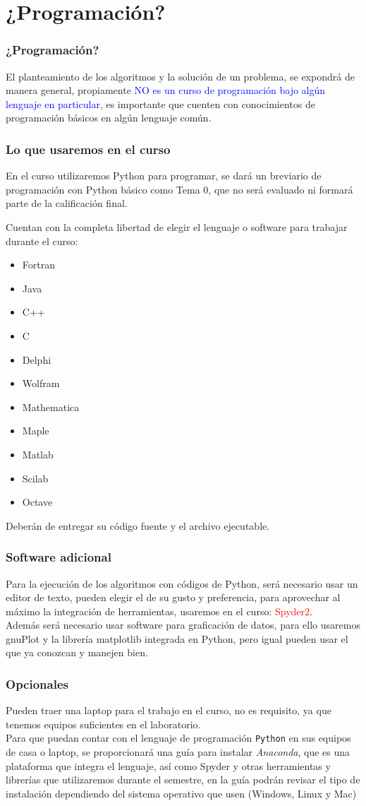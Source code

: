 \documentclass[12pt]{beamer}
\begin{document}
\section{¿Programación?}
\begin{frame}
\frametitle{¿Programación?}
El planteamiento de los algoritmos y la solución de un problema, se expondrá de manera general, propiamente \textcolor{blue}{NO es un curso de programación bajo algún lenguaje en particular}, es importante que cuenten con conocimientos de programación básicos en algún lenguaje común.
\end{frame}
\begin{frame}
\frametitle{Lo que usaremos en el curso}
En el curso utilizaremos Python para programar, se dará un breviario de programación con Python básico como Tema 0, que no será evaluado ni formará parte de la calificación final.
\end{frame}
\begin{frame}
Cuentan con la completa libertad de elegir el lenguaje o software para trabajar durante el curso:
\begin{multicols}{2}
\begin{itemize}
\item Fortran
\item Java
\item C++
\item C
\item Delphi
\item Wolfram
\item Mathematica
\item Maple
\item Matlab
\item Scilab
\item Octave
\end{itemize}
\end{multicols}
Deberán de entregar su código fuente y el archivo ejecutable.
\end{frame}
\begin{frame}
\frametitle{Software adicional}
Para la ejecución de los algoritmos con códigos de Python, será necesario usar un editor de texto, pueden elegir el de su gusto y preferencia, para aprovechar al máximo la integración de herramientas, usaremos en el curso: \textcolor{red}{Spyder2}.
\\
\bigskip
Además será necesario usar software para graficación de datos, para ello usaremos gnuPlot y la librería matplotlib integrada en Python, pero igual pueden usar el que ya conozcan y manejen bien.
\end{frame}
\begin{frame}
\frametitle{Opcionales}
Pueden traer una laptop para el trabajo en el curso, no es requisito, ya que tenemos equipos suficientes en el laboratorio.
\\
\medskip
Para que puedan contar con el lenguaje de programación \texttt{Python} en sus equipos de casa o laptop, se proporcionará una guía para instalar \emph{Anaconda}, que es una plataforma que integra el lenguaje, así como Spyder y otras herramientas y librerías que utilizaremos durante el semestre, en la guía podrán revisar el tipo de instalación dependiendo del sistema operativo que usen (Windows, Linux y Mac)
\end{frame}
\end{document}
